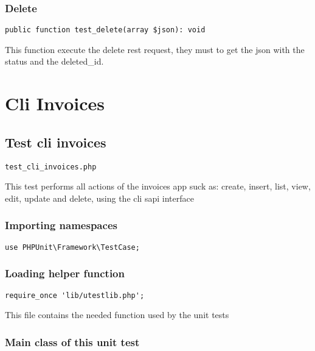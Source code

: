 \documentclass[a4paper]{article}
\begin{document}
\hypertarget{toc68}{}
\subsubsection{Delete}

\begin{lstlisting}
public function test_delete(array $json): void
\end{lstlisting}

This function execute the delete rest request, they must to get the json
with the status and the deleted\_id.


\hypertarget{toc69}{}
\section{Cli Invoices}

\hypertarget{toc70}{}
\subsection{Test cli invoices}

\begin{lstlisting}
test_cli_invoices.php
\end{lstlisting}

This test performs all actions of the invoices app suck as: create, insert,
list, view, edit, update and delete, using the cli sapi interface

\hypertarget{toc71}{}
\subsubsection{Importing namespaces}

\begin{lstlisting}
use PHPUnit\Framework\TestCase;
\end{lstlisting}

\hypertarget{toc72}{}
\subsubsection{Loading helper function}

\begin{lstlisting}
require_once 'lib/utestlib.php';
\end{lstlisting}

This file contains the needed function used by the unit tests

\hypertarget{toc73}{}
\subsubsection{Main class of this unit test}
\end{document}
